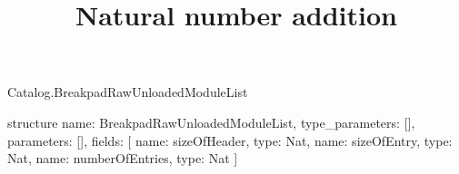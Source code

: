 \begin{lexlean}{Catalog.BreakpadRawUnloadedModuleList}
\title{Natural number addition}
\begin{semanticmodule}
structure{
  name: BreakpadRawUnloadedModuleList,
  type_parameters: [],
  parameters: [],
  fields: [
    {name: sizeOfHeader, type: Nat},
    {name: sizeOfEntry, type: Nat},
    {name: numberOfEntries, type: Nat}
  ]
}
\end{semanticmodule}
\end{lexlean}
